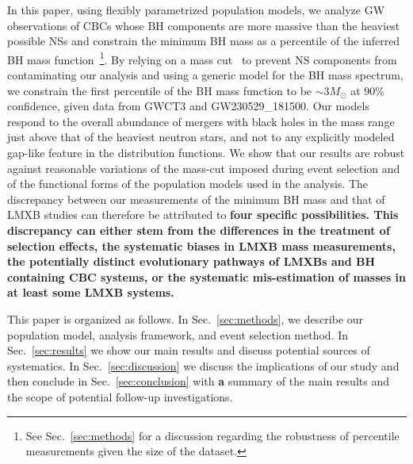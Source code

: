 \documentclass[modern]{aastex631}
\begin{document}
In this paper, using flexibly parametrized population models, we analyze GW
observations of CBCs whose BH components are more massive than the heaviest
possible NSs and constrain the minimum BH mass as a percentile of the inferred
BH mass function~\citep[similar to the approach of X-ray binary studies,
][]{Farr:2010tu}\footnote{See Sec.~\ref{sec:methods} for a discussion regarding the robustness of percentile measurements given the size of the dataset.}.  By relying on a mass cut~\citep{Roy:2025ktr} to prevent NS components from
contaminating our analysis and using a generic model for the BH mass spectrum,
we constrain the first percentile of the BH mass function to be $\sim
3M_{\odot}$ at $90\%$ confidence, given data from GWCT3 and GW230529\_181500. Our models
respond to the overall abundance of mergers with black holes in the mass range
just above that of the heaviest neutron stars, and not to any explicitly modeled
gap-like feature in the distribution functions. We show that our results are
robust against reasonable variations of the mass-cut imposed during event
selection and of the functional forms of the population models used in the
analysis. The discrepancy between our measurements of the minimum BH mass and
that of LMXB studies can therefore be attributed to \textbf{four specific possibilities. This discrepancy can either stem from the differences in
the treatment of selection effects, the systematic biases in LMXB mass measurements, the potentially distinct evolutionary
pathways of LMXBs and BH containing CBC systems, or the systematic mis-estimation
of masses in at least some LMXB systems.}

This paper is organized as follows. In Sec.~\ref{sec:methods}, we describe our population model, analysis framework, and event selection method. In Sec.~\ref{sec:results} we show our main results and discuss potential sources of systematics. In Sec.~\ref{sec:discussion} we discuss the implications of our study and then conclude in Sec.~\ref{sec:conclusion} with \textbf{a} summary of the main results and the scope of potential follow-up investigations.
\end{document}
